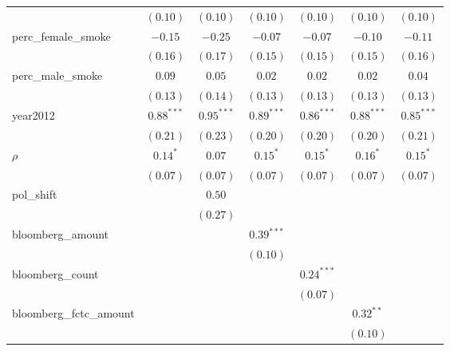 \begin{table}[!h]
\begin{center}
\begin{tabular}{l c c c c c c }
                        & $(0.10)$     & $(0.10)$     & $(0.10)$     & $(0.10)$     & $(0.10)$     & $(0.10)$     \\
perc\_female\_smoke     & $-0.15$      & $-0.25$      & $-0.07$      & $-0.07$      & $-0.10$      & $-0.11$      \\
                        & $(0.16)$     & $(0.17)$     & $(0.15)$     & $(0.15)$     & $(0.15)$     & $(0.16)$     \\
perc\_male\_smoke       & $0.09$       & $0.05$       & $0.02$       & $0.02$       & $0.02$       & $0.04$       \\
                        & $(0.13)$     & $(0.14)$     & $(0.13)$     & $(0.13)$     & $(0.13)$     & $(0.13)$     \\
year2012                & $0.88^{***}$ & $0.95^{***}$ & $0.89^{***}$ & $0.86^{***}$ & $0.88^{***}$ & $0.85^{***}$ \\
                        & $(0.21)$     & $(0.23)$     & $(0.20)$     & $(0.20)$     & $(0.20)$     & $(0.21)$     \\
$\rho$                  & $0.14^{*}$   & $0.07$       & $0.15^{*}$   & $0.15^{*}$   & $0.16^{*}$   & $0.15^{*}$   \\
                        & $(0.07)$     & $(0.07)$     & $(0.07)$     & $(0.07)$     & $(0.07)$     & $(0.07)$     \\
pol\_shift              &              & $0.50$       &              &              &              &              \\
                        &              & $(0.27)$     &              &              &              &              \\
bloomberg\_amount       &              &              & $0.39^{***}$ &              &              &              \\
                        &              &              & $(0.10)$     &              &              &              \\
bloomberg\_count        &              &              &              & $0.24^{***}$ &              &              \\
                        &              &              &              & $(0.07)$     &              &              \\
bloomberg\_fctc\_amount &              &              &              &              & $0.32^{**}$  &              \\
                        &              &              &              &              & $(0.10)$     &              \\

\end{tabular}
\end{center}
\end{table}
